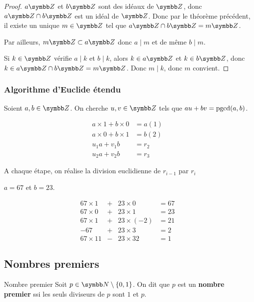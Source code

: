 \begin{proof}
    $a \Z$ et $b \Z$ sont des idéaux de $\Z$, donc $a \Z \cap b \Z$ est un idéal de $\Z$. 
    Donc par le théorème précédent, il existe un unique $m \in \Z$ tel que $a \Z \cap b \Z = m \Z$.

    Par ailleurs, $m \Z \subset a \Z$ donc $a \mid m$ et de même $b \mid m$.

    Si $k \in \Z$ vérifie $a \mid k$ et $b \mid k$, alors $k \in a \Z$ et $k \in b \Z$, donc
    $k \in a \Z \cap b \Z = m \Z$. Donc $m \mid k$, donc $m$ convient.
\end{proof}

\subsubsection{Algorithme d'Euclide étendu}

Soient $a, b \in \Z$. On cherche $u, v \in \Z$ tels que $au + bv = \operatorname{pgcd}(a, b)$.


\begin{align*}
    a \times 1 + b \times 0 & = a (1)\\
    a \times 0 + b \times 1 & = b (2)\\
    u_1 a + v_1 b & = r_2 \\
    u_2 a + v_2 b & = r_3 
\end{align*}

A chaque étape, on réalise la division euclidienne de $r_{i-1}$ par $r_i$

\begin{exemple}
    $a = 67$ et $b = 23$. 

    \[\begin{array}{rccl}
        67 \times 1 & + & 23 \times 0 & = 67 \\
        67 \times 0 & + & 23 \times 1 & = 23 \\
        67 \times 1 & + & 23 \times (-2) & = 21 \\
        -67 & + & 23 \times 3 & = 2 \\
        67 \times 11 & - & 23 \times 32 & = 1
    \end{array}\]
\end{exemple}

\subsection{Nombres premiers}

\begin{definition}{Nombre premier}{}
    Soit $p \in \N \setminus \{0, 1\}$. On dit que $p$ est un \textbf{nombre premier} ssi
    les seuls diviseurs de $p$ sont $1$ et $p$.
\end{definition}

